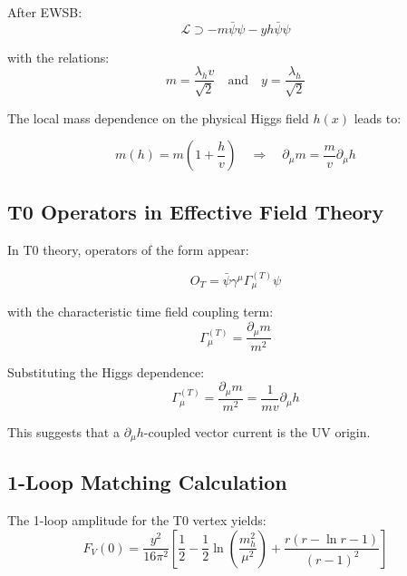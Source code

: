 	After EWSB:
	\begin{equation}
		\mathcal{L} \supset -m \bar{\psi}\psi - y h \bar{\psi}\psi
	\end{equation}
	
	with the relations:
	\begin{equation}
		m = \frac{\lambda_h v}{\sqrt{2}} \quad \text{and} \quad y = \frac{\lambda_h}{\sqrt{2}}
	\end{equation}
	
	The local mass dependence on the physical Higgs field $h(x)$ leads to:
	
	\begin{equation}
		m(h) = m\left(1 + \frac{h}{v}\right) \quad \Rightarrow \quad \partial_\mu m = \frac{m}{v}\partial_\mu h
	\end{equation}
	
	\subsection{T0 Operators in Effective Field Theory}
	\label{subsec:t0_operators}
	
	In T0 theory, operators of the form appear:
	
	\begin{equation}
		O_T = \bar{\psi}\gamma^\mu\Gamma_\mu^{(T)}\psi
	\end{equation}
	
	with the characteristic time field coupling term:
	\begin{equation}
		\Gamma_\mu^{(T)} = \frac{\partial_\mu m}{m^2}
	\end{equation}
	
	Substituting the Higgs dependence:
	\begin{equation}
		\Gamma_\mu^{(T)} = \frac{\partial_\mu m}{m^2} = \frac{1}{mv}\partial_\mu h
	\end{equation}
	
	This suggests that a $\partial_\mu h$-coupled vector current is the UV origin.
	
	\subsection{1-Loop Matching Calculation}
	\label{subsec:one_loop_matching}
	
	The 1-loop amplitude for the T0 vertex yields:
	\begin{equation}
		F_V(0) = \frac{y^2}{16\pi^2}\left[\frac{1}{2} - \frac{1}{2}\ln\left(\frac{m_h^2}{\mu^2}\right) + \frac{r(r-\ln r-1)}{(r-1)^2}\right]
	\end{equation}
	
